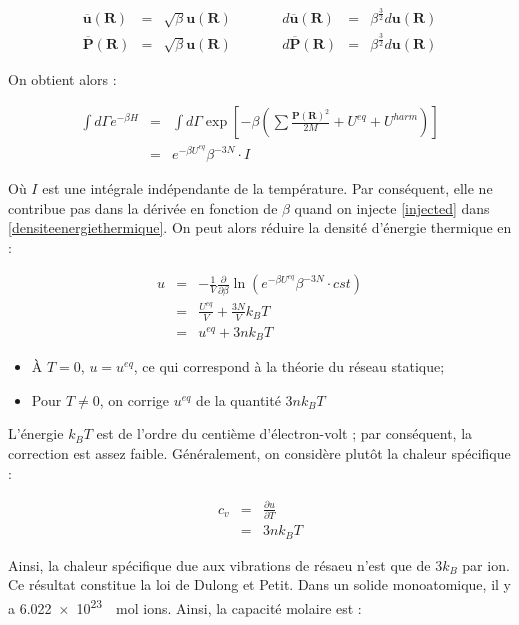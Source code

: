 \begin{align}
    \mathbf{\overline{u}(R)} & = & \sqrt{\beta} \mathbf{u(R)} & \qquad &
    d\mathbf{\overline{u}(R)} & = & \beta^{\frac{3}{2}} d\mathbf{u(R)} \\
    \mathbf{\overline{P}(R)} & = & \sqrt{\beta} \mathbf{u(R)} & \qquad &
    d\mathbf{\overline{P}(R)} & = & \beta^{\frac{3}{2}} d\mathbf{u(R)}
\end{align}

On obtient alors :

\begin{eqnarray}
    \int d\Gamma e^{-\beta H} & = & \int d\Gamma \exp \left[ -\beta \left( \sum
    \frac{\mathbf{P(R)}^2}{2M} + U^{eq} + U^{harm} \right) \right] \\
    & = & e^{-\beta U^{eq}} \beta^{-3N} \cdot I 
    \label{injected}
\end{eqnarray}

Où $I$ est une intégrale indépendante de la température. Par conséquent, elle ne
contribue pas dans la dérivée en fonction de $\beta$ quand on injecte
\ref{injected} dans \ref{densiteenergiethermique}. On peut alors réduire
la densité d'énergie thermique en :

\begin{eqnarray}
    u &= & -\frac{1}{V} \frac{\partial}{\partial \beta} \ln \left( e^{-\beta U^{eq}} \beta^{-3N} \cdot cst \right) \\
    & = & \frac{U^{eq}}{V} + \frac{3N}{V}k_BT\\
    & = & u^{eq} + 3nk_BT
\end{eqnarray}

\begin{itemize}
    \item À $T=0$, $u=u^{eq}$, ce qui correspond à la théorie du réseau statique;
    \item Pour $T\neq0$, on corrige $u^{eq}$ de la quantité $3nk_BT$
\end{itemize}

L'énergie $k_BT$ est de l'ordre du centième d'électron-volt ; par conséquent,
la correction est assez faible. Généralement, on considère plutôt la chaleur
spécifique :

\begin{eqnarray}
    c_v & =&  \frac{\partial u}{\partial T} \\
    & = & 3nk_BT
\end{eqnarray}

Ainsi, la chaleur spécifique due aux vibrations de résaeu n'est que de $3k_B$
par ion. Ce résultat constitue la loi de Dulong et Petit. Dans un solide
monoatomique, il y a \SI{6.022e23}{\per\mol} ions. Ainsi, la capacité molaire
est :

